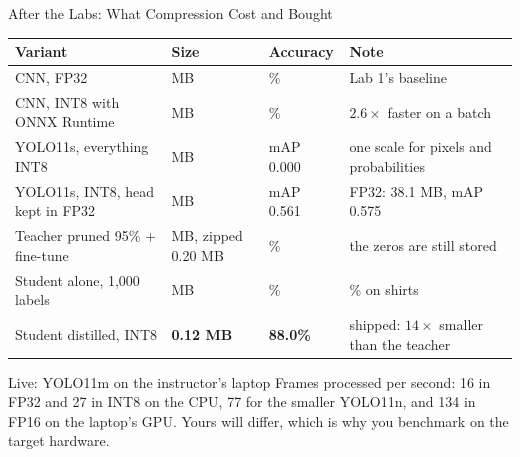 \begin{frame}{After the Labs: What Compression Cost and Bought}
    \centering
    \renewcommand{\arraystretch}{1.25}
    {\scriptsize
    \begin{tabular}{>{\raggedright\arraybackslash}p{4.3cm}>{\raggedright\arraybackslash}p{3.1cm}>{\raggedright\arraybackslash}p{1.7cm}>{\raggedright\arraybackslash}p{4.0cm}}
        \toprule
        \textbf{Variant} & \textbf{Size} & \textbf{Accuracy} & \textbf{Note} \\
        \midrule
        CNN, FP32                         & 1.69 MB               & 89.1\%    & Lab 1's baseline \\
        CNN, INT8 with ONNX Runtime       & 0.43 MB               & 89.1\%    & $2.6\times$ faster on a batch \\
        YOLO11s, everything INT8          & 10.2 MB               & mAP 0.000 & one scale for pixels and probabilities \\
        YOLO11s, INT8, head kept in FP32  & 10.2 MB               & mAP 0.561 & FP32: 38.1 MB, mAP 0.575 \\
        Teacher pruned 95\% + fine-tune   & 1.69 MB, zipped 0.20 MB & 89.9\%    & the zeros are still stored \\
        Student alone, 1,000 labels       & 0.43 MB               & 82.3\%    & 37.5\% on shirts \\
        Student distilled, INT8           & \textbf{0.12 MB}      & \textbf{88.0\%} & shipped: $14\times$ smaller than the teacher \\
        \bottomrule
    \end{tabular}}
    \vspace{0.5em}
    \begin{block}{Live: YOLO11m on the instructor's laptop}
        Frames processed per second: 16 in FP32 and 27 in INT8 on the CPU, 77 for the smaller YOLO11n, and 134 in FP16
        on the laptop's GPU. Yours will differ, which is why you benchmark on the target hardware.
    \end{block}
\end{frame}
